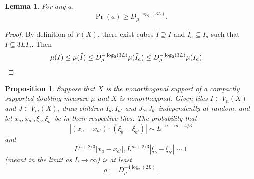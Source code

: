 \documentclass[reqno,12pt]{amsart}
\newtheorem{lemma}[theorem]{Lemma}
\newtheorem{proposition}[theorem]{Proposition}
\theoremstyle{definition}
\numberwithin{equation}{section}
\begin{document}
\begin{lemma}
For any $a$,
$$\Pr(a) \geq D_\mu^{-\log_2(3L)}.$$
\end{lemma}
\begin{proof}
By definition of $V(X)$, there exist cubes $\tilde I \supseteq I$ and $\tilde I_a \subseteq I_a$ such that $\tilde I \subseteq 3L \tilde I_a$.
Then 
\begin{align*}
    \mu(I) &\leq \mu(\tilde I) \leq D_\mu^{-\log_2(3L)} \mu(\tilde I_a) \leq D_\mu^{-\log_2(3L)} \mu(I_a). \qedhere 
\end{align*}
\end{proof}

\begin{proposition}
Suppose that $X$ is the nonorthogonal support of a compactly supported doubling measure $\mu$ and $X$ is nonorthogonal.
Given tiles $I \in V_n(X)$ and $J \in V_m(X)$, draw children $I_a, I_{a'}$ and $J_b, J_{b'}$ independently at random, and let $x_a, x_{a'}, \xi_b, \xi_{b'}$ be in their respective tiles. 
The probability that 
$$|(x_a - x_{a'}) \cdot (\xi_b - \xi_{b'})| \sim L^{-n-m-4/3}$$
and 
$$L^{n+2/3} |x_a - x_{a'}|, L^{m+2/3} |\xi_b - \xi_{b'}| \sim 1$$
(meant in the limit as $L \to \infty$)
is at least
\begin{equation}\label{probability bound}
    \rho := D_\mu^{-4\log_2(2L)}.
\end{equation}
\end{proposition}
\end{document}
